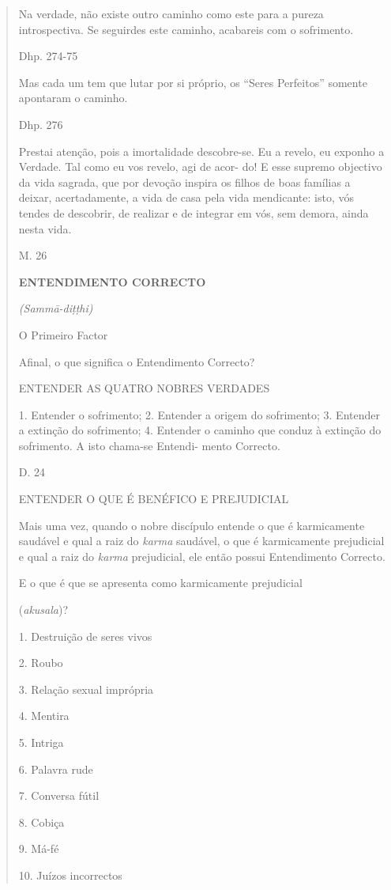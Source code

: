 \begin{quote}
Na verdade, não existe outro caminho como este para a pureza introspectiva. Se seguirdes este caminho, acabareis com o sofrimento.

Dhp. 274-75

Mas cada um tem que lutar por si próprio, os ``Seres Perfeitos'' somente apontaram o caminho.

Dhp. 276

Prestai atenção, pois a imortalidade descobre-se. Eu a revelo, eu exponho a Verdade. Tal como eu vos revelo, agi de acor- do! E esse supremo objectivo da vida sagrada, que por devoção inspira os filhos de boas famílias a deixar, acertadamente, a vida de casa pela vida mendicante: isto, vós tendes de descobrir, de realizar e de integrar em vós, sem demora, ainda nesta vida.

M. 26

\textbf{ENTENDIMENTO CORRECTO}

\emph{(Sammā-diṭṭhi)}

O Primeiro Factor

Afinal, o que significa o Entendimento Correcto?

ENTENDER AS QUATRO NOBRES VERDADES

1. Entender o sofrimento; 2. Entender a origem do sofrimento; 3. Entender a extinção do sofrimento; 4. Entender o caminho que conduz à extinção do sofrimento. A isto chama-se Entendi- mento Correcto.

D. 24

ENTENDER O QUE É BENÉFICO E PREJUDICIAL

Mais uma vez, quando o nobre discípulo entende o que é karmicamente saudável e qual a raiz do \emph{karma} saudável, o que é karmicamente prejudicial e qual a raiz do \emph{karma} prejudicial, ele então possui Entendimento Correcto.

E o que é que se apresenta como karmicamente prejudicial

(\emph{akusala})?

1. Destruição de seres vivos

2. Roubo

3. Relação sexual imprópria

4. Mentira

5. Intriga

6. Palavra rude

7. Conversa fútil

8. Cobiça

9. Má-fé

10. Juízos incorrectos
\end{quote}


